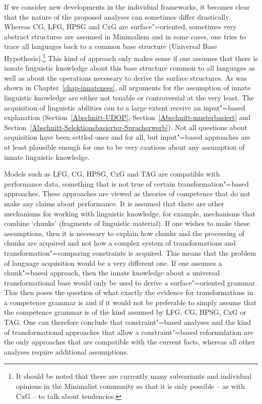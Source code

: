 If we consider new developments in the individual frameworks, it becomes clear that the nature of the proposed analyses can sometimes differ drastically.
Whereas CG, LFG, HPSG and CxG are surface"=oriented, sometimes very abstract structures are assumed in Minimalism and in some cases, one tries to trace all languages back
to a common base structure (Universal Base Hypothesis).\footnote{
  It should be noted that there are currently many subvariants and individual opinions in the Minimalist community so that it
  is only possible -- as with CxG -- to talk about tendencies.%
} This kind of approach only makes sense if one assumes that there is innate linguistic knowledge about this base structure
common to all languages as well as about the operations necessary to derive the surface structures.
As was shown in Chapter~\ref{chap-innateness}, all arguments for the assumption of innate linguistic knowledge are either not tenable
or controversial at the very least.
The acquisition of linguistic abilities can to a large extent receive an input"=based explanation
(Section~\ref{Abschnitt-UDOP}, Section~\ref{Abschnitt-musterbasiert} and
Section~\ref{Abschnitt-Selektionsbasierter-Spracherwerb}). Not all questions about acquisition have
been settled once and for all, but input"=based approaches are at least plausible enough for one to be very cautious about any assumption of innate linguistic knowledge.

Models such as LFG, CG, HPSG, CxG and TAG are compatible with performance data, something that is not true of certain transformation"=based approaches.
These approaches are viewed as theories of competence that do not make any claims about performance. It is assumed that there are other mechanisms
for working with linguistic knowledge, for example, mechanisms that combine `chunks' (fragments of linguistic material). If one wishes to make these assumptions,
then it is necessary to explain how chunks and the processing of chunks are acquired and not how a complex system of transformations and transformation"=comparing
constraints is acquired. This means that the problem of language acquisition would be a very different one. If one assumes a chunk"=based approach, then the innate
knowledge about a universal transformational base would only be used to derive a surface"=oriented grammar. This then poses the question of what exactly the evidence
for transformations in a competence grammar is and if it would not be preferable to simply assume that the competence grammar is of the kind assumed by LFG, CG, HPSG,
CxG or TAG. One can therefore conclude that constraint"=based analyses and the kind of
transformational approaches that allow a constraint"=based reformulation are the only approaches that are compatible with the current facts, whereas all other analyses require additional assumptions.


